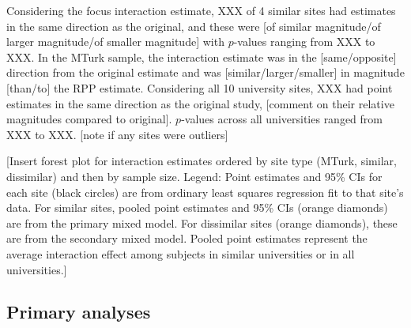 \documentclass[english,floatsintext,man]{apa6}
\theoremstyle{definition}
\theoremstyle{definition}
\theoremstyle{definition}
\theoremstyle{remark}
\begin{document}
Considering the focus interaction estimate, XXX of 4 similar sites had
estimates in the same direction as the original, and these were {[}of
similar magnitude/of larger magnitude/of smaller magnitude{]} with
\(p\)-values ranging from XXX to XXX. In the MTurk sample, the
interaction estimate was in the {[}same/opposite{]} direction from the
original estimate and was {[}similar/larger/smaller{]} in magnitude
{[}than/to{]} the RPP estimate. Considering all 10 university sites, XXX
had point estimates in the same direction as the original study,
{[}comment on their relative magnitudes compared to original{]}.
\(p\)-values across all universities ranged from XXX to XXX. {[}note if
any sites were outliers{]}

{[}Insert forest plot for interaction estimates ordered by site type
(MTurk, similar, dissimilar) and then by sample size. Legend: Point
estimates and 95\% CIs for each site (black circles) are from ordinary
least squares regression fit to that site's data. For similar sites,
pooled point estimates and 95\% CIs (orange diamonds) are from the
primary mixed model. For dissimilar sites (orange diamonds), these are
from the secondary mixed model. Pooled point estimates represent the
average interaction effect among subjects in similar universities or in
all universities.{]}

\subsection{Primary analyses}\label{primary-analyses}
\end{document}
